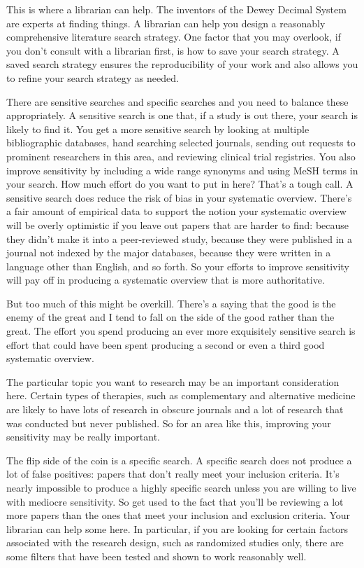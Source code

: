 \documentclass[
  letterpaper,
  DIV=11,
  numbers=noendperiod]{scrreprt}
\begin{document}
\begin{tcolorbox}
This is where a librarian can help. The inventors of the Dewey Decimal
System are experts at finding things. A librarian can help you design a
reasonably comprehensive literature search strategy. One factor that you
may overlook, if you don't consult with a librarian first, is how to
save your search strategy. A saved search strategy ensures the
reproducibility of your work and also allows you to refine your search
strategy as needed.

There are sensitive searches and specific searches and you need to
balance these appropriately. A sensitive search is one that, if a study
is out there, your search is likely to find it. You get a more sensitive
search by looking at multiple bibliographic databases, hand searching
selected journals, sending out requests to prominent researchers in this
area, and reviewing clinical trial registries. You also improve
sensitivity by including a wide range synonyms and using MeSH terms in
your search. How much effort do you want to put in here? That's a tough
call. A sensitive search does reduce the risk of bias in your systematic
overview. There's a fair amount of empirical data to support the notion
your systematic overview will be overly optimistic if you leave out
papers that are harder to find: because they didn't make it into a
peer-reviewed study, because they were published in a journal not
indexed by the major databases, because they were written in a language
other than English, and so forth. So your efforts to improve sensitivity
will pay off in producing a systematic overview that is more
authoritative.

But too much of this might be overkill. There's a saying that the good
is the enemy of the great and I tend to fall on the side of the good
rather than the great. The effort you spend producing an ever more
exquisitely sensitive search is effort that could have been spent
producing a second or even a third good systematic overview.

The particular topic you want to research may be an important
consideration here. Certain types of therapies, such as complementary
and alternative medicine are likely to have lots of research in obscure
journals and a lot of research that was conducted but never published.
So for an area like this, improving your sensitivity may be really
important.

The flip side of the coin is a specific search. A specific search does
not produce a lot of false positives: papers that don't really meet your
inclusion criteria. It's nearly impossible to produce a highly specific
search unless you are willing to live with mediocre sensitivity. So get
used to the fact that you'll be reviewing a lot more papers than the
ones that meet your inclusion and exclusion criteria. Your librarian can
help some here. In particular, if you are looking for certain factors
associated with the research design, such as randomized studies only,
there are some filters that have been tested and shown to work
reasonably well.


\end{tcolorbox}
\end{document}
